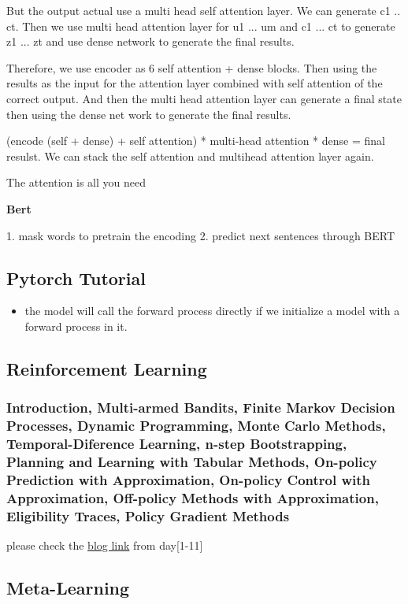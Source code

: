 \documentclass[UTF8]{article}
\begin{document}
But the output actual use a multi head self attention layer. We can generate c1 .. ct. Then we use multi head attention layer for u1 ... um and c1 ... ct to generate z1 ... zt and use dense network to generate the final results.

Therefore, we use encoder as 6 self attention + dense blocks. Then using the results as the input for the attention layer combined with self attention of the correct output. And then the multi head attention layer can generate a final state then using the dense net work to generate the final results.

(encode (self + dense) + self attention) * multi-head attention * dense = final resulst. We can stack the self attention and multihead attention layer again.

The attention is all you need~\cite{vaswani2017attention}

\textbf{Bert}

1. mask words to pretrain the encoding
2. predict next sentences through BERT

\subsection{Pytorch Tutorial}
\begin{itemize}
    \item the model will call the forward process directly if we initialize a model with a forward process in it.
\end{itemize}
\subsection{Reinforcement Learning}
\subsubsection{Introduction, Multi-armed Bandits, Finite Markov Decision Processes, Dynamic Programming, Monte Carlo Methods, Temporal-Diference Learning, n-step Bootstrapping, Planning and Learning with Tabular Methods, On-policy Prediction with Approximation, On-policy Control with Approximation, Off-policy Methods with Approximation, Eligibility Traces, Policy Gradient Methods}

please check the \href{https://zzz0906.github.io/tags/ReinforcementLearning/}{blog link} from day[1-11]

\subsection{Meta-Learning}
\end{document}
